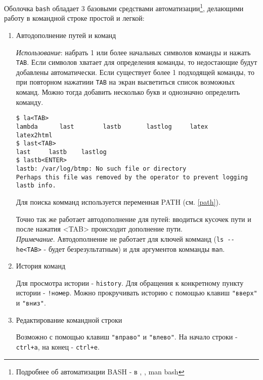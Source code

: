 Оболочка \verb+bash+ обладает 3 базовыми средствами автоматизации\footnote{Подробнее об автоматизации BASH - в \cite{Asp}, \cite{Pet}, man bash}, делающими работу в командной строке простой и легкой:
\begin{enumerate}
\item Автодополнение путей и команд

\emph{Использование}: набрать 1 или более начальных символов команды и нажать \verb+TAB+. Если символов хватает для определения команды, то недостающие будут добавлены автоматически. Если существует более 1 подходящей команды, то при повторном нажатиии \verb+TAB+ на экран высветиться список возможных команд. Можно тогда добавить несколько букв и однозначно определить команду.
\begin{verbatim}
$ la<TAB>
lambda      last        lastb       lastlog     latex       latex2html
$ last<TAB>
last     lastb    lastlog  
$ lastb<ENTER>
lastb: /var/log/btmp: No such file or directory
Perhaps this file was removed by the operator to prevent logging lastb info.
\end{verbatim}
Для поиска комманд используется переменная PATH (см. \ref{path}). 

Точно так же работает автодополнение для путей: вводиться кусочек пути и после нажатия <TAB> происходит дополнение пути.\\

\emph{Примечание}. Автодополнение не работает для ключей комманд (\verb+ls --he<TAB>+ - будет безрезультатным) и для аргументов комманды \verb+man+.
\item История команд

Для просмотра истории - \verb+history+. Для обращения к конкретному пункту истории - \verb+!номер+. Можно прокручивать историю с помощью клавиш \verb+"вверх"+ и \verb+"вниз"+. 
\item Редактирование командной строки

Возможно с помощью клавиш \verb+"вправо"+ и \verb+"влево"+. На начало строки - \verb-ctrl+a-, на конец - \verb-ctrl+e-.
\end{enumerate}
